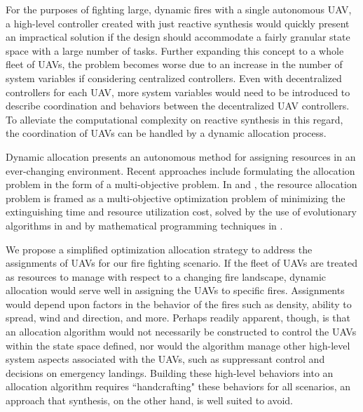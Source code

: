\documentclass{ieeeaccess}
\begin{document}
For the purposes of fighting large, dynamic fires with a single autonomous UAV, a high-level controller created with just reactive synthesis would quickly present an impractical solution if the design should accommodate a fairly granular state space with a large number of tasks. Further expanding this concept to a whole fleet of UAVs, the problem becomes worse due to an increase in the number of system variables if considering centralized controllers. Even with decentralized controllers for each UAV, more system variables would need to be introduced to describe coordination and behaviors between the decentralized UAV controllers. To alleviate the computational complexity on reactive synthesis in this regard, the coordination of UAVs can be handled by a dynamic allocation process. %

Dynamic allocation presents an autonomous method for assigning resources in an ever-changing environment. Recent approaches include formulating the allocation problem in the form of a multi-objective problem. In \cite{c15} and \cite{16}, the resource allocation problem is framed as a multi-objective optimization problem of minimizing the extinguishing time and resource utilization cost, solved by the use of evolutionary algorithms in \cite{c15} and by mathematical programming techniques in \cite{16}. 

We propose a simplified optimization allocation strategy to address the assignments of UAVs for our fire fighting scenario. If the fleet of UAVs are treated as resources to manage with respect to a changing fire landscape, dynamic allocation would serve well in assigning the UAVs to specific fires. Assignments would depend upon factors in the behavior of the fires such as density, ability to spread, wind and direction, and more. Perhaps readily apparent, though, is that an allocation algorithm would not necessarily be constructed to control the UAVs within the state space defined, nor would the algorithm manage other high-level system aspects associated with the UAVs, such as suppressant control and decisions on emergency landings. Building these high-level behaviors into an allocation algorithm requires ``handcrafting" these behaviors for all scenarios, an approach that synthesis, on the other hand, is well suited to avoid.
\end{document}
